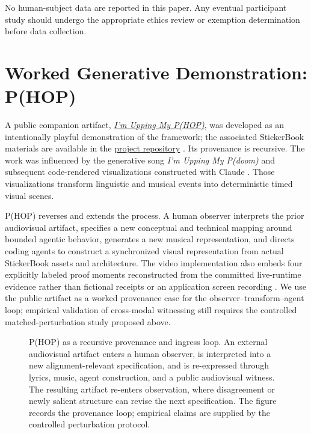 \documentclass[11pt]{article}
\begin{document}
No human-subject data are reported in this paper. Any eventual participant study should undergo the appropriate ethics review or exemption determination before data collection.

\section{Worked Generative Demonstration: P(HOP)}
A public companion artifact, \href{https://youtu.be/vpu4tmhyj04}{\emph{I'm Upping My P(HOP)}}, was developed as an intentionally playful demonstration of the framework; the associated StickerBook materials are available in the \href{https://github.com/PaulTiffany/stickerbook}{project repository} \citep{tiffany2026phop,tiffany2026stickerbook}. Its provenance is recursive. The work was influenced by the generative song \emph{I'm Upping My P(doom)} and subsequent code-rendered visualizations constructed with Claude \citep{mexicat2026pdoom,heibel2026pdoom}. Those visualizations transform linguistic and musical events into deterministic timed visual scenes.

P(HOP) reverses and extends the process. A human observer interprets the prior audiovisual artifact, specifies a new conceptual and technical mapping around bounded agentic behavior, generates a new musical representation, and directs coding agents to construct a synchronized visual representation from actual StickerBook assets and architecture. The video implementation also embeds four explicitly labeled proof moments reconstructed from the committed live-runtime evidence rather than fictional receipts or an application screen recording \citep{tiffany2026stickerbookproof,tiffany2026stickerbookvideo}. We use the public artifact as a worked provenance case for the observer--transform--agent loop; empirical validation of cross-modal witnessing still requires the controlled matched-perturbation study proposed above.

\begin{figure}[t]
\centering
\resizebox{0.98\textwidth}{!}{}
\caption{P(HOP) as a recursive provenance and ingress loop. An external audiovisual artifact enters a human observer, is interpreted into a new alignment-relevant specification, and is re-expressed through lyrics, music, agent construction, and a public audiovisual witness. The resulting artifact re-enters observation, where disagreement or newly salient structure can revise the next specification. The figure records the provenance loop; empirical claims are supplied by the controlled perturbation protocol.}
\label{fig:phop-loop}
\end{figure}
\end{document}
